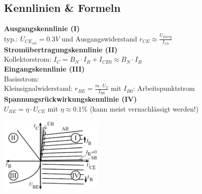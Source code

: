 	\subsection{Kennlinien \& Formeln}
		\begin{minipage}[c]{12cm}
			{\bf Ausgangskennlinie (I)}\\
				typ.: $U_{CE_{sat}}=0.3V$ und Ausgangswiderstand $r_{CE} \approx \frac{U_{Early}}{I_{C0}}$\\
				\hspace{2mm}
			{\bf Stromübertragungskennlinie (II)}\\
				Kollektorstrom: $I_C = B_N \cdot I_B + I_{CE0} \approx B_N \cdot I_B$\\
				\hspace{2mm}	
			{\bf Eingangskennlinie (III)}\\
				Basisstrom: \\
				Kleinsignalwiderstand: $r_{BE} = \frac{m\cdot U_T}{I_{B0}}$ mit $I_{B0}$: Arbeitspunktstrom\\
				\hspace{2mm}
			{\bf Spannungsrückwirkungskennlinie (IV)}\\
				$U_{BE} = \eta \cdot U_{CE}$ mit $\eta \approx 0.1 \%$ (kann meist vernachlässigt werden!)\\
        \end{minipage}	
		\begin{minipage}[c]{5cm}
			\includegraphics[width=5cm]{./images/BipTraKennlinien.png}
		\end{minipage}
		
